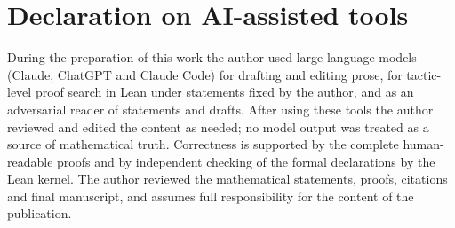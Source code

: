 \section*{Declaration on AI-assisted tools}
During the preparation of this work the author used large language models (Claude, ChatGPT and Claude Code) for drafting and editing prose, for tactic-level proof search in Lean under statements fixed by the author, and as an adversarial reader of statements and drafts. After using these tools the author reviewed and edited the content as needed; no model output was treated as a source of mathematical truth. Correctness is supported by the complete human-readable proofs and by independent checking of the formal declarations by the Lean kernel. The author reviewed the mathematical statements, proofs, citations and final manuscript, and assumes full responsibility for the content of the publication.

